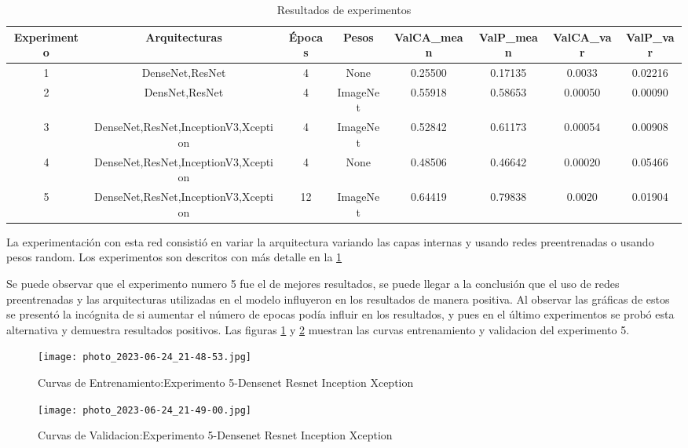 \documentclass[article]{llncs}
\begin{document}
\begin{table}[h]
    \centering
    \begin{tabular}{|c|c|c|c|c|c|c|c|}
    \hline
    Experimento & Arquitecturas & Épocas & Pesos & ValCA\_mean & ValP\_mean & ValCA\_var & ValP\_var \\
    \hline
    1 & DenseNet,ResNet & 4 & None & 0.25500 & 0.17135 & 0.0033 & 0.02216 \\
    2 & DensNet,ResNet & 4 & ImageNet & 0.55918 & 0.58653 & 0.00050 & 0.00090 \\
    3 & DenseNet,ResNet,InceptionV3,Xception & 4 & ImageNet & 0.52842 & 0.61173 & 0.00054 & 0.00908 \\
    4 & DenseNet,ResNet,InceptionV3,Xception & 4 & None & 0.48506 & 0.46642 & 0.00020 & 0.05466 \\
    5 & DenseNet,ResNet,InceptionV3,Xception & 12 & ImageNet & 0.64419 & 0.79838 & 0.0020 & 0.01904 \\
    \hline
    \end{tabular}
    \caption{Resultados de experimentos}
    \label{tab:resultados1}
    \end{table}

La experimentaci\'on con esta red consisti\'o en variar la arquitectura variando las capas internas y usando redes 
preentrenadas o usando pesos random. Los experimentos son descritos con m\'as detalle en la \ref{tab:resultados1}

Se puede observar que el experimento numero 5 fue el de mejores resultados, se puede llegar a la conclusión que el uso de 
redes preentrenadas y las arquitecturas utilizadas en el modelo influyeron en los resultados de manera positiva. Al observar 
las gráficas de estos se presentó la incógnita de si aumentar el número de epocas podía influir en los resultados, y pues en 
el último experimentos se probó esta alternativa y demuestra resultados positivos. Las figuras \ref{fig:exp5_sample1} y
\ref{fig:exp5_sample2} muestran las curvas entrenamiento y validacion del experimento 5.



\begin{figure}[ht]
    \centering
    \texttt{[image: photo\_2023-06-24\_21-48-53.jpg]}
    \caption{Curvas de Entrenamiento:Experimento 5-Densenet Resnet Inception Xception}
    \label{fig:exp5_sample1}
    \end{figure}
    
    \begin{figure}[ht]
    \centering
    \texttt{[image: photo\_2023-06-24\_21-49-00.jpg]}
    \caption{Curvas de Validacion:Experimento 5-Densenet Resnet Inception Xception}
    \label{fig:exp5_sample2}
    \end{figure}
\end{document}
